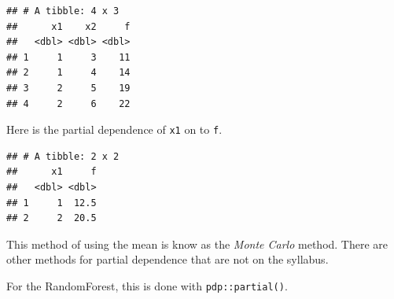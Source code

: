 \documentclass[
  openany]{book}
\newenvironment{Shaded}{\begin{snugshade}}{\end{snugshade}}
\newcommand{\DataTypeTok}[1]{\textcolor[rgb]{0.13,0.29,0.53}{#1}}
\newcommand{\DecValTok}[1]{\textcolor[rgb]{0.00,0.00,0.81}{#1}}
\newcommand{\KeywordTok}[1]{\textcolor[rgb]{0.13,0.29,0.53}{\textbf{#1}}}
\newcommand{\NormalTok}[1]{#1}
\newcommand{\OperatorTok}[1]{\textcolor[rgb]{0.81,0.36,0.00}{\textbf{#1}}}
\newcommand{\StringTok}[1]{\textcolor[rgb]{0.31,0.60,0.02}{#1}}
\begin{document}
\begin{verbatim}
## # A tibble: 4 x 3
##      x1    x2     f
##   <dbl> <dbl> <dbl>
## 1     1     3    11
## 2     1     4    14
## 3     2     5    19
## 4     2     6    22
\end{verbatim}

Here is the partial dependence of \texttt{x1} on to \texttt{f}.

\begin{Shaded}
\end{Shaded}

\begin{verbatim}
## # A tibble: 2 x 2
##      x1     f
##   <dbl> <dbl>
## 1     1  12.5
## 2     2  20.5
\end{verbatim}

This method of using the mean is know as the \emph{Monte Carlo} method. There are other methods for partial dependence that are not on the syllabus.

For the RandomForest, this is done with \texttt{pdp::partial()}.

\begin{Shaded}
\end{Shaded}
\end{document}
